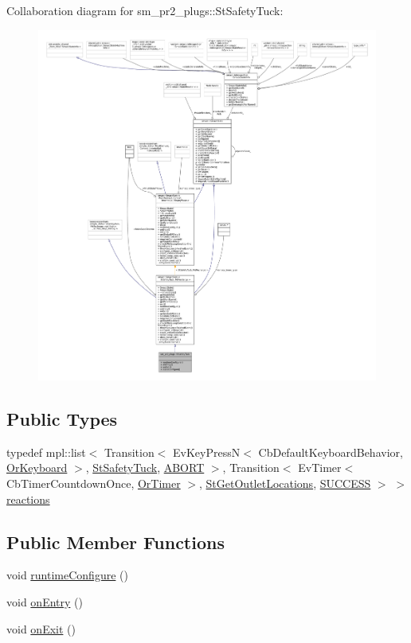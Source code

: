 Collaboration diagram for sm\+\_\+pr2\+\_\+plugs\+:\+:St\+Safety\+Tuck\+:
\nopagebreak
\begin{figure}[H]
\begin{center}
\leavevmode
\includegraphics[width=350pt]{structsm__pr2__plugs_1_1StSafetyTuck__coll__graph}
\end{center}
\end{figure}
\subsection*{Public Types}
\begin{DoxyCompactItemize}
\item 
typedef mpl\+::list$<$ Transition$<$ Ev\+Key\+PressN$<$ Cb\+Default\+Keyboard\+Behavior, \hyperlink{classsm__pr2__plugs_1_1OrKeyboard}{Or\+Keyboard} $>$, \hyperlink{structsm__pr2__plugs_1_1StSafetyTuck}{St\+Safety\+Tuck}, \hyperlink{classABORT}{A\+B\+O\+RT} $>$, Transition$<$ Ev\+Timer$<$ Cb\+Timer\+Countdown\+Once, \hyperlink{classsm__pr2__plugs_1_1OrTimer}{Or\+Timer} $>$, \hyperlink{structsm__pr2__plugs_1_1StGetOutletLocations}{St\+Get\+Outlet\+Locations}, \hyperlink{classSUCCESS}{S\+U\+C\+C\+E\+SS} $>$ $>$ \hyperlink{structsm__pr2__plugs_1_1StSafetyTuck_a6162ef008d6b48278427d85e91a926c8}{reactions}
\end{DoxyCompactItemize}
\subsection*{Public Member Functions}
\begin{DoxyCompactItemize}
\item 
void \hyperlink{structsm__pr2__plugs_1_1StSafetyTuck_ae58dc354ff826ff1a124376272f75cc9}{runtime\+Configure} ()
\item 
void \hyperlink{structsm__pr2__plugs_1_1StSafetyTuck_a1d9b7a09905580b0583da82c0288e538}{on\+Entry} ()
\item 
void \hyperlink{structsm__pr2__plugs_1_1StSafetyTuck_ab64ca8822680e6dcb709a4a47c9a10aa}{on\+Exit} ()
\end{DoxyCompactItemize}
